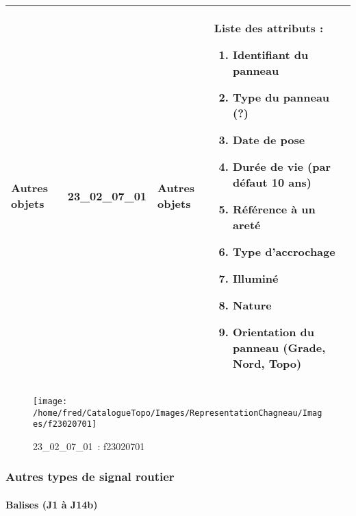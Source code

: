 \documentclass[12pt,titlepage]{book}
\begin{document}
\renewcommand{\arraystretch}{1.2}
\begin{supertabular}{|p{10cm}|c|p{13cm}|p{12cm}|}
 Autres objets & 23\_02\_07\_01 & Autres objets & Liste des attributs :
\begin{enumerate}
  \item Identifiant du panneau  \item Type du panneau (?)  \item Date de pose  \item Durée de vie (par défaut 10 ans)  \item Référence à un areté  \item Type d'accrochage  \item Illuminé  \item Nature  \item Orientation du panneau (Grade, Nord, Topo)\end{enumerate}
\\
\hline
\end{supertabular}
\begin{figure}[h!]
  \hfill         %
  \begin{minipage}[t]{3cm}
    \begin{center}
      \texttt{[image: /home/fred/CatalogueTopo/Images/RepresentationChagneau/Images/f23020701]}
      \caption[~23\_02\_07\_01]{\small{23\_02\_07\_01~:} \tiny{f23020701}}\label{f23020701}
    \end{center}
  \end{minipage}
\end{figure}

\subsubsection{\large Autres types de signal routier}
\paragraph{Balises (J1 à J14b)}
\noindent
\vspace{\baselineskip}
\end{document}
